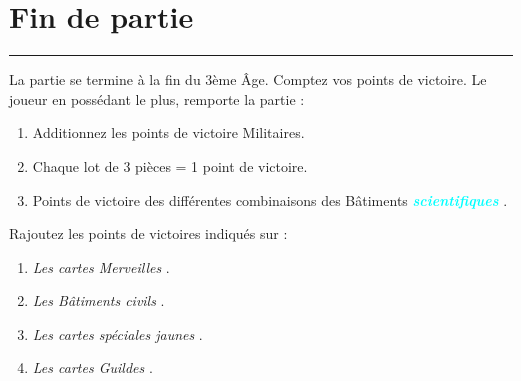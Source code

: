 \documentclass{scrartcl}%
\begin{document}
\section{ Fin de partie
}%
\label{sec:Findepartie}%
\textcolor{cyan}{\rule{18cm}{0.07cm}}\break%
La partie se termine à la fin du 3ème Âge. Comptez vos points de victoire. Le joueur en possédant le plus, remporte la partie :
%
\begin{enumerate}%
\item%
%
 Additionnez les points de victoire Militaires.
%
\item%
%
 Chaque lot de 3 pièces = 1 point de victoire.
%
\item%
%
 Points de victoire des différentes combinaisons des Bâtiments %
\textcolor{cyan}{\textbf{\textit{scientifiques}}}%
.
%
\end{enumerate}%
Rajoutez les points de victoires indiqués sur :
%
\begin{enumerate}%
\item%
%
\textit{Les cartes Merveilles}%
.
%
\item%
%
\textit{Les Bâtiments civils}%
. 
%
\item%
%
\textit{Les cartes spéciales jaunes}%
.
%
\item%
%
\textit{Les cartes Guildes}%
.%
\end{enumerate}

%
\end{document}
